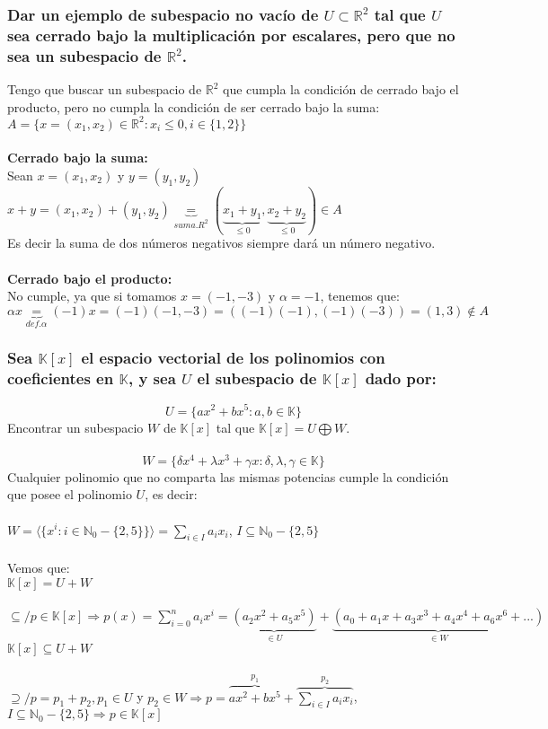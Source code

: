 \documentclass{article}
\begin{document}
\subsubsection{Dar un ejemplo de subespacio no vacío de $U \subset \mathbb{R}^2$ tal que $U$ sea cerrado bajo la multiplicación por 
escalares, pero que no sea un subespacio de $\mathbb{R}^2$.}
Tengo que buscar un subespacio de $\mathbb{R}^2$ que cumpla la condición de cerrado bajo el producto, pero no cumpla la condición
de ser cerrado bajo la suma: \\
$A = \{ x=(x_1,x_2) \in \mathbb{R}^2: x_i \leq 0, i \in \{ 1,2 \} \}$ \\ \\
\textbf{Cerrado bajo la suma:} \\
Sean $x = (x_1,x_2)$ y $y = (y_1,y_2)$ \\
$x+y = (x_1,x_2) + (y_1,y_2) \underbrace{=}_{suma.R^2} (\underbrace{x_1+y_1}_{\leq 0},\underbrace{x_2+y_2}_{\leq 0}) \in A$ \\
Es decir la suma de dos números negativos siempre dará un número negativo. \\ \\
\textbf{Cerrado bajo el producto:} \\
No cumple, ya que si tomamos $x=(-1,-3)$ y $\alpha = -1$, tenemos que: \\
$\alpha x \underbrace{=}_{def.\alpha} (-1) x = (-1)(-1,-3) = ((-1)(-1),(-1)(-3)) = (1,3) \not \in A$

\subsubsection{Sea $\mathbb{K}[x]$ el espacio vectorial de los polinomios con coeficientes en $\mathbb{K}$, y sea $U$ el subespacio
de $\mathbb{K}[x]$ dado por:}
\[
U = \{ ax^2 + bx^5 : a,b \in \mathbb{K} \}
\]
Encontrar un subespacio $W$ de $\mathbb{K}[x]$ tal que $\mathbb{K}[x] = U \bigoplus W$. \\ \\
\[
W = \{ \delta x^4 + \lambda x^3 + \gamma x: \delta,\lambda,\gamma \in \mathbb{K} \}
\]
Cualquier polinomio que no comparta las mismas potencias cumple la condición que posee el polinomio $U$, es decir: \\ \\
$W = \langle \{ x^i : i \in \mathbb{N}_0 - \{ 2,5 \} \} \rangle = \displaystyle \sum_{i \in I}{a_i x_i}$, $I \subseteq \mathbb{N}_0 - \{ 2,5 \}$ \\ \\
Vemos que: \\
$\mathbb{K}[x] = U+W$ \\ \\
$\subseteq/ p \in \mathbb{K}[x] \Rightarrow p(x) = \displaystyle \sum_{i=0}^n{a_i x^i} = \underbrace{(a_2x^2+a_5x^5)}_{\in U}+\underbrace{(a_0 + a_1x + a_3x^3
+a_4x^4 + a_6x^6 + ...)}_{\in W}$ \\
$\mathbb{K}[x] \subseteq U+W$ \\ \\
$\supseteq/ p = p_1+p_2, p_1 \in U$ y $p_2 \in W \Rightarrow p = \overbrace{ax^2+bx^5}^{p_1} + \overbrace{\sum_{i \in I}{a_i x_i}}^{p_2}$, 
$I \subseteq \mathbb{N}_0 - \{ 2,5 \} \Rightarrow p \in \mathbb{K}[x]$
\\
\end{document}
